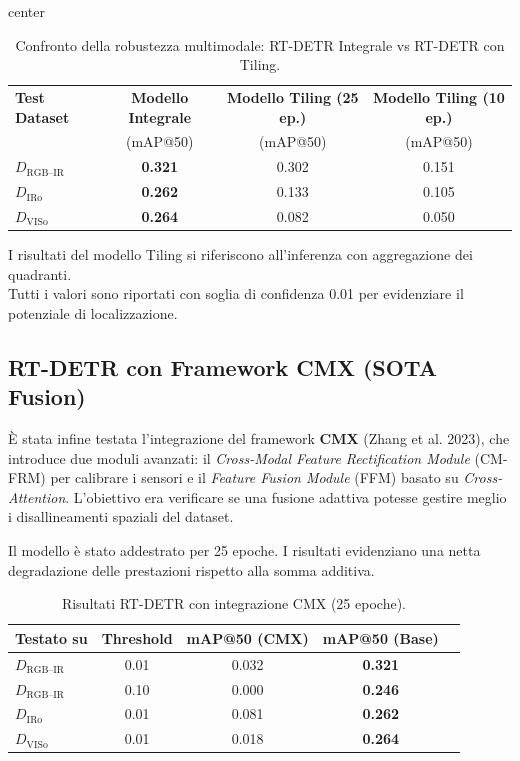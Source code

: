 \documentclass[a4paper,11pt]{article}
\begin{document}
\begin{table}[h]
\centering
\caption{Confronto della robustezza multimodale: RT-DETR Integrale vs RT-DETR con Tiling.}
\label{tab:rtdetr_comparison_final}
\begin{adjustbox}{center}
\begin{tabular}{lccc}
\toprule
\textbf{Test Dataset} & \textbf{Modello Integrale} & \textbf{Modello Tiling (25 ep.)} & \textbf{Modello Tiling (10 ep.)}\\
& (mAP@50) & (mAP@50) & (mAP@50) \\
\midrule
$D_{\text{RGB--IR}}$ & \textbf{0.321} & 0.302 & 0.151 \\
$D_{\text{IRo}}$ & \textbf{0.262} & 0.133 & 0.105 \\
$D_{\text{VISo}}$ & \textbf{0.264} & 0.082 & 0.050\\
\bottomrule
\end{tabular}
\end{adjustbox}
\par\smallskip
\small *I risultati del modello Tiling si riferiscono all'inferenza con aggregazione dei quadranti. \\
Tutti i valori sono riportati con soglia di confidenza 0.01 per evidenziare il potenziale di localizzazione.
\end{table}


\subsection*{RT-DETR con Framework CMX (SOTA Fusion)}
È stata infine testata l'integrazione del framework \textbf{CMX} (Zhang et al. 2023), che introduce due moduli avanzati: il \emph{Cross-Modal Feature Rectification Module} (CM-FRM) per calibrare i sensori e il \emph{Feature Fusion Module} (FFM) basato su \emph{Cross-Attention}. L'obiettivo era verificare se una fusione adattiva potesse gestire meglio i disallineamenti spaziali del dataset.

Il modello è stato addestrato per 25 epoche. I risultati evidenziano una netta degradazione delle prestazioni rispetto alla somma additiva.

\begin{table}[h]
\centering
\caption{Risultati RT-DETR con integrazione CMX (25 epoche).}
\label{tab:rtdetr_cmx}
\begin{tabular}{lcccc}
\toprule
Testato su & Threshold & mAP@50 (CMX) & mAP@50 (Base) \\
\midrule
$D_{\text{RGB--IR}}$ & 0.01 & 0.032 & \textbf{0.321} \\
$D_{\text{RGB--IR}}$ & 0.10 & 0.000 & \textbf{0.246} \\
\midrule
$D_{\text{IRo}}$ & 0.01 & 0.081 & \textbf{0.262} \\
$D_{\text{VISo}}$ & 0.01 & 0.018 & \textbf{0.264} \\
\bottomrule
\end{tabular}
\end{table}
\end{document}
